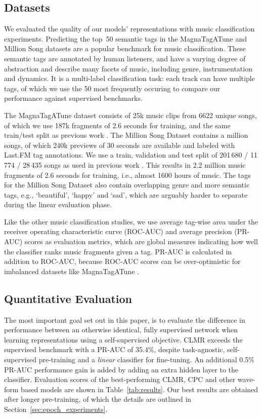 \documentclass{article}
\begin{document}
\subsection{Datasets}
We evaluated the quality of our models' representations with music classification experiments.
Predicting the top~50 semantic tags in the Magna\-Tag\-A\-Tune and Million Song datasets  \cite{law2009evaluation,Bertin-Mahieux2011} are a popular benchmark for music classification.
These semantic tags are annotated by human listeners, and have a
varying degree of abstraction and describe many facets of music,
including genre, instrumentation and dynamics.
It is a multi-label classification task: each track can have multiple tags, of which we use the 50 most frequently occuring to compare our performance against supervised benchmarks.

The Magna\-Tag\-A\-Tune dataset consists of 25k music clips from 6622 unique songs, of which we use 187k fragments of 2.6 seconds for training, and the same train/test split as previous work \cite{pons_end--end_2017, lee2018samplecnn, dieleman_feature_learning}.
The Million Song Dataset contains a million songs, of which 240k previews of 30 seconds are available and labeled with Last.FM tag annotations.
We use a train, validation and test split of 201\,680 / 11\,774 / 28\,435 songs as used in previous work \cite{pons_end--end_2017, lee2018samplecnn}.
This results in 2.2 million music fragments of 2.6 seconds for training, i.e., almost 1600 hours of music.
The tags for the Million Song Dataset also contain overlapping genre and more semantic tags, e.g., `beautiful', `happy' and `sad', which are arguably harder to separate during the linear evaluation phase.

Like the other music classification studies, we use average tag-wise area under the receiver operating characteristic curve  (ROC-AUC) and average precision (PR-AUC) scores as evaluation metrics, which are global measures indicating how well the classifier ranks music fragments given a tag.
PR-AUC is calculated in addition to ROC-AUC, because ROC-AUC scores can be over-optimistic for imbalanced datasets like Magna\-Tag\-A\-Tune \cite{David-2006}.

\subsection{Quantitative Evaluation}
The most important goal set out in this paper, is to evaluate the difference in performance between an otherwise identical, fully supervised network when learning representations using a self-supervised objective.
CLMR exceeds the supervised benchmark with a PR-AUC of 35.4\%, despite task-agnostic, self-supervised pre-training and a \textit{linear} classifier for fine-tuning.
An additional 0.5\% PR-AUC performance gain is added by adding an extra hidden layer to the classifier.
Evaluation scores of the best-performing CLMR, CPC and other wave-form based models are shown in Table~\ref{tab:results}.
Our best results are obtained after longer pre-training, of which the details are outlined in Section~\ref{sec:epoch_experiments}.
\end{document}
